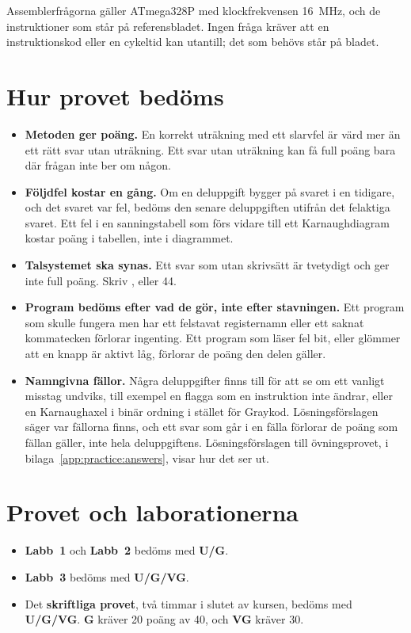 Assemblerfrågorna gäller ATmega328P med klockfrekvensen 16~MHz, och de instruktioner som står på
referensbladet. Ingen fråga kräver att en instruktionskod eller en cykeltid kan utantill; det som
behövs står på bladet.

\section*{Hur provet bedöms}
\begin{itemize}
  \item \textbf{Metoden ger poäng.} En korrekt uträkning med ett slarvfel är värd mer än ett rätt
    svar utan uträkning. Ett svar utan uträkning kan få full poäng bara där frågan inte ber om
    någon.
  \item \textbf{Följdfel kostar en gång.} Om en deluppgift bygger på svaret i en tidigare, och det
    svaret var fel, bedöms den senare deluppgiften utifrån det felaktiga svaret. Ett fel i en
    sanningstabell som förs vidare till ett Karnaughdiagram kostar poäng i tabellen, inte i
    diagrammet.
  \item \textbf{Talsystemet ska synas.} Ett svar som  utan skrivsätt är tvetydigt och ger
    inte full poäng. Skriv ,  eller 44.
  \item \textbf{Program bedöms efter vad de gör, inte efter stavningen.} Ett program som skulle
    fungera men har ett felstavat registernamn eller ett saknat kommatecken förlorar ingenting. Ett
    program som läser fel bit, eller glömmer att en knapp är aktivt låg, förlorar de poäng den delen
    gäller.
  \item \textbf{Namngivna fällor.} Några deluppgifter finns till för att se om ett vanligt misstag
    undviks, till exempel en flagga som en instruktion inte ändrar, eller en Karnaughaxel i binär
    ordning i stället för Graykod. Lösningsförslagen säger var fällorna finns, och ett svar som går
    i en fälla förlorar de poäng som fällan gäller, inte hela deluppgiftens. Lösningsförslagen till
    övningsprovet, i bilaga~\ref{app:practice:answers}, visar hur det ser ut.
\end{itemize}

\section*{Provet och laborationerna}
\begin{itemize}
  \item \textbf{Labb~1} och \textbf{Labb~2} bedöms med \textbf{U/G}.
  \item \textbf{Labb~3} bedöms med \textbf{U/G/VG}.
  \item Det \textbf{skriftliga provet}, två timmar i slutet av kursen, bedöms med \textbf{U/G/VG}.
    \textbf{G} kräver 20 poäng av 40, och \textbf{VG} kräver 30.
\end{itemize}


